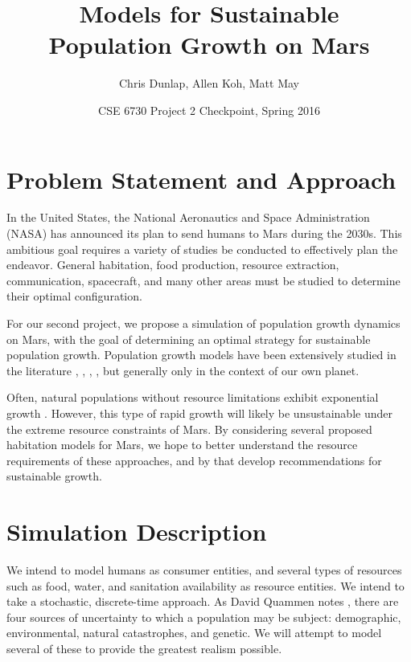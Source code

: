 \documentclass[12pt]{article}
\title{Models for Sustainable \\Population Growth on Mars}
\author{Chris Dunlap, Allen Koh, Matt May}
\date{CSE 6730 Project 2 Checkpoint, Spring 2016}
\begin{document}
\begin{titlepage}
  \maketitle
  \thispagestyle{empty}
\end{titlepage}

\newpage
  \tableofcontents
  \thispagestyle{empty}
\newpage

\section{Problem Statement and Approach}
\label{sec:problem}

In the United States, the National Aeronautics and Space Administration (NASA)
has announced its plan to send humans to Mars during the 2030s. This ambitious
goal requires a variety of studies be conducted to effectively plan the
endeavor. General habitation, food production, resource extraction,
communication, spacecraft, and many other areas must be studied to determine
their optimal configuration.

For our second project, we propose a simulation of population growth dynamics on
Mars, with the goal of determining an optimal strategy for sustainable
population growth. Population growth models have been extensively studied in the
literature \cite{clark1967population}, \cite{caswell2001matrix},
\cite{meadows1992beyond}, \cite{boserup1983population},
\cite{ehrlich1971impact} but generally only in the context of our own planet.

Often, natural populations without resource limitations exhibit exponential
growth \cite{audesirk1996biology}. However, this type of rapid growth will
likely be unsustainable under the extreme resource constraints of Mars.
By considering several proposed habitation models for Mars, we hope to better
understand the resource requirements of these approaches, and by that develop
recommendations for sustainable growth.

\section{Simulation Description}
\label{sec:simdescrip}

We intend to model humans as consumer entities, and several
types of resources such as food, water, and sanitation availability as resource
entities. We intend to take a stochastic, discrete-time approach. As David
Quammen notes \cite{quammen1996song}, there are four sources of uncertainty to
which a population may be subject: demographic, environmental, natural
catastrophes, and genetic. We will attempt to model several of these to
provide the greatest realism possible.
\end{document}
